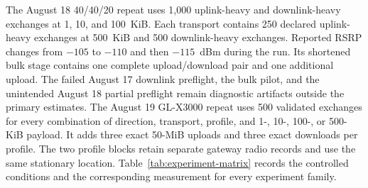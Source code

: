 The August 18 40/40/20 repeat uses 1,000 uplink-heavy and downlink-heavy
exchanges at 1, 10, and 100~KiB. Each transport contains 250 declared
uplink-heavy exchanges at 500~KiB and 500 downlink-heavy exchanges. Reported RSRP
changes from $-105$ to $-110$ and then $-115$~dBm during the run. Its shortened
bulk stage contains one complete upload/download pair and one additional
upload. The failed August 17 downlink preflight, the bulk pilot, and the
unintended August 18 partial preflight remain diagnostic artifacts outside the
primary estimates.
The August 19 GL-X3000 repeat uses 500 validated exchanges for every
combination of direction, transport, profile, and 1-, 10-, 100-, or 500-KiB
payload. It adds three exact 50-MiB uploads and three exact downloads per
profile. The two profile blocks retain separate gateway radio records and use
the same stationary location.
Table~\ref{tab:experiment-matrix} records the controlled conditions and the
corresponding measurement for every experiment family.

